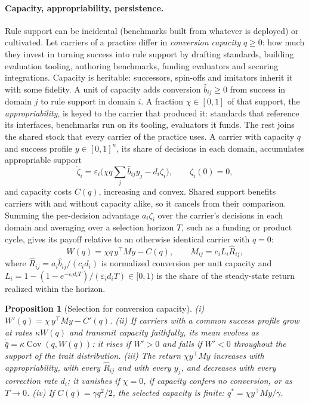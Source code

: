 \documentclass[letterpaper]{article} %
\newtheorem{proposition}{Proposition}
\theoremstyle{definition}
\begin{document}
\paragraph{Capacity, appropriability, persistence.} Rule support can be incidental (benchmarks built from whatever is deployed) or cultivated. Let carriers of a practice differ in \emph{conversion capacity} $q\ge0$: how much they invest in turning success into rule support by drafting standards, building evaluation tooling, authoring benchmarks, funding evaluators and securing integrations. Capacity is heritable: successors, spin-offs and imitators inherit it with some fidelity. A unit of capacity adds conversion $\hat b_{ij}\ge0$ from success in domain $j$ to rule support in domain $i$. A fraction $\chi\in[0,1]$ of that support, the \emph{appropriability}, is keyed to the carrier that produced it: standards that reference its interfaces, benchmarks run on its tooling, evaluators it funds. The rest joins the shared stock that every carrier of the practice uses. A carrier with capacity $q$ and success profile $y\in[0,1]^n$, its share of decisions in each domain, accumulates appropriable support
\begin{equation}\label{eq:rho}
\dot\zeta_i=\varepsilon_i\Big(\chi q\textstyle\sum_j\hat b_{ij}y_j-d_i\zeta_i\Big),\qquad \zeta_i(0)=0,
\end{equation}
and capacity costs $C(q)$, increasing and convex. Shared support benefits carriers with and without capacity alike, so it cancels from their comparison. Summing the per-decision advantage $a_i\zeta_i$ over the carrier's decisions in each domain and averaging over a selection horizon $T$, such as a funding or product cycle, gives its payoff relative to an otherwise identical carrier with $q=0$:
\begin{equation}\label{eq:W}
W(q)=\chi q\,y^{\top}My-C(q),\qquad M_{ij}=c_iL_i\hat R_{ij},
\end{equation}
where $\hat R_{ij}=a_i\hat b_{ij}/(c_id_i)$ is normalized conversion per unit capacity and $L_i=1-(1-e^{-\varepsilon_id_iT})/(\varepsilon_id_iT)\in[0,1)$ is the share of the steady-state return realized within the horizon.

\begin{proposition}[Selection for conversion capacity]\label{prop:capacity}
(i) $W'(q)=\chi\,y^{\top}My-C'(q)$. (ii) If carriers with a common success profile grow at rates $\kappa W(q)$ and transmit capacity faithfully, its mean evolves as $\dot{\bar q}=\kappa\operatorname{Cov}(q,W(q))$: it rises if $W'>0$ and falls if $W'<0$ throughout the support of the trait distribution. (iii) The return $\chi y^{\top}My$ increases with appropriability, with every $\hat R_{ij}$ and with every $y_j$, and decreases with every correction rate $d_i$; it vanishes if $\chi=0$, if capacity confers no conversion, or as $T\to0$. (iv) If $C(q)=\gamma q^2/2$, the selected capacity is finite: $q^\ast=\chi y^{\top}My/\gamma$.
\end{proposition}
\end{document}
